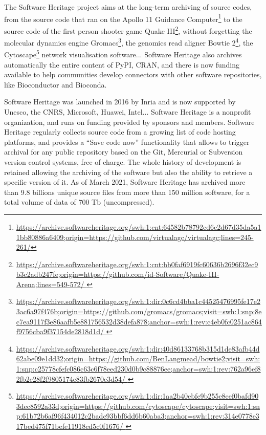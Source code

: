 \documentclass[long, final]{jobim}
\begin{document}
The Software Heritage project\cite{dicosmo2017} aims at the long-term archiving of source codes, from the source code that ran on 
the Apollo 11 Guidance Computer\footnote{\url{https://archive.softwareheritage.org/swh:1:cnt:64582b78792cd6c2d67d35da5a11bb80886a6409;origin=https://github.com/virtualagc/virtualagc;lines=245-261/}} 
to the source code of the first person shooter game Quake III\footnote{\url{https://archive.softwareheritage.org/swh:1:cnt:bb0faf6919fc60636b2696f32ec9b3c2adb247fe;origin=https://github.com/id-Software/Quake-III-Arena;lines=549-572/ }}, 
without forgetting the molecular dynamics engine Gromacs\footnote{\url{https://archive.softwareheritage.org/swh:1:dir:0c6cd4bba1c44525476995fe17e23ac6a97f476b;origin=https://github.com/gromacs/gromacs;visit=swh:1:snp:8ec7ea9117f3e86aafb5e881756532d38defa878;anchor=swh:1:rev:c4eb0fc0251ac864f9756cba9f37154de2818d1d/ }}, 
the genomics read aligner Bowtie 2\footnote{\url{https://archive.softwareheritage.org/swh:1:dir:40d86133768b315d1de83afb44d62abe09e1dd32;origin=https://github.com/BenLangmead/bowtie2;visit=swh:1:snp:c25778cfefc086c63c6f78eed230d0b9c88876ee;anchor=swh:1:rev:762a96ef82fb2e28f2f9805174e83fb2670e3d54/ }}, 
the Cytoscape\footnote{\url{https://archive.softwareheritage.org/swh:1:dir:1aa2b40ebfe9b255e8eef0bafd903dec8592a33d;origin=https://github.com/cytoscape/cytoscape;visit=swh:1:snp:61b72b6af96f434012c2badc93bbf6dd6b60aba3;anchor=swh:1:rev:314e0778e317bed475f71befe11918cd5c0f1676/ }} network visualisation software... 
Software Heritage also archives automatically the entire content of PyPI, CRAN, and there is now funding available to help communities develop connectors with other software repositories, like Bioconductor and Bioconda.

Software Heritage was launched in 2016 by Inria and is now supported by Unesco, the CNRS, Microsoft, Huawei, Intel... Software Heritage is a nonprofit organization, and runs on funding provided by sponsors and members. Software Heritage regularly collects source code from a growing list of code hosting platforms, and provides a “Save code now” functionality that allows to trigger archival for any public repository based on the Git, Mercurial or Subversion version control systems, free of charge. The whole history of development is retained allowing the archiving of the software but also the ability to retrieve a specific version of it. As of March 2021, Software Heritage has archived more than 9.8 billions unique source files from more than 150 million software, for a total volume of data of 700 Tb (uncompressed).
\end{document}
